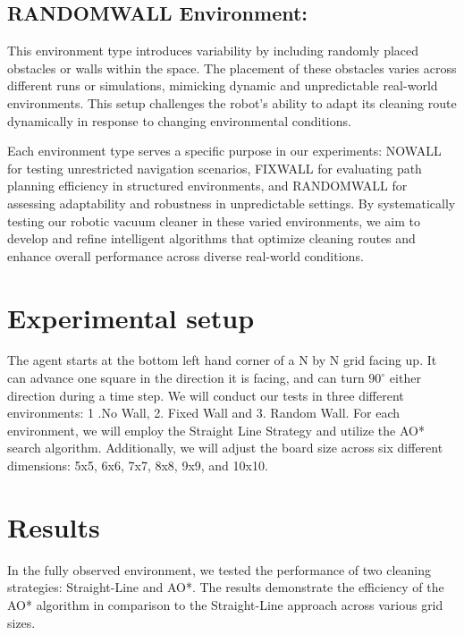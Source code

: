\documentclass{article}
\begin{document}
\subsection{RANDOMWALL Environment:} This environment type introduces variability by including randomly placed obstacles or walls within the space. The placement of these obstacles varies across different runs or simulations, mimicking dynamic and unpredictable real-world environments. This setup challenges the robot's ability to adapt its cleaning route dynamically in response to changing environmental conditions.


Each environment type serves a specific purpose in our experiments: NOWALL for testing unrestricted navigation scenarios, FIXWALL for evaluating path planning efficiency in structured environments, and RANDOMWALL for assessing adaptability and robustness in unpredictable settings. By systematically testing our robotic vacuum cleaner in these varied environments, we aim to develop and refine intelligent algorithms that optimize cleaning routes and enhance overall performance across diverse real-world conditions.

\section{Experimental setup}
The agent starts at the bottom left hand corner of a N by N grid facing up. 
It can advance one square in the direction it is facing, and can turn $90^\circ$ either direction during a time step. 
We will conduct our tests in three different environments: 1 .No Wall, 2. Fixed Wall and 3. Random Wall.
For each environment, we will employ the Straight Line Strategy and utilize the AO* search algorithm. Additionally, we will adjust the board size across six different dimensions: 5x5, 6x6, 7x7, 8x8, 9x9, and 10x10.

 



\section{Results}
In the fully observed environment, we tested the performance of two cleaning strategies: Straight-Line and AO*. The results demonstrate the efficiency of the AO* algorithm in comparison to the Straight-Line approach across various grid sizes.
\end{document}
